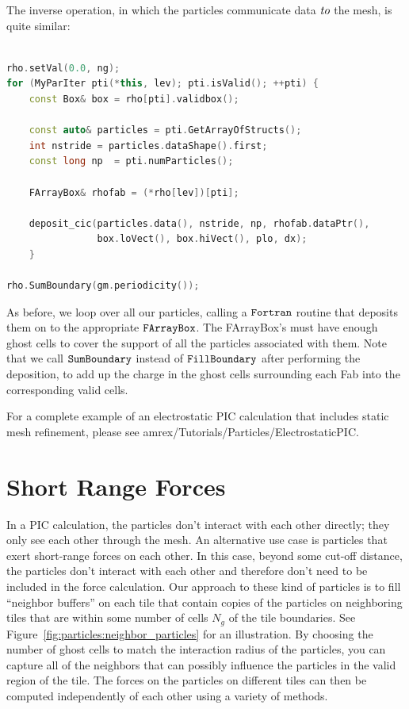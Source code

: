 The inverse operation, in which the particles communicate data $\emph{to}$ the mesh, is quite similar:

\begin{lstlisting}[language=cpp]

rho.setVal(0.0, ng);
for (MyParIter pti(*this, lev); pti.isValid(); ++pti) {
    const Box& box = rho[pti].validbox();

    const auto& particles = pti.GetArrayOfStructs();
    int nstride = particles.dataShape().first;
    const long np  = pti.numParticles();

    FArrayBox& rhofab = (*rho[lev])[pti];

    deposit_cic(particles.data(), nstride, np, rhofab.dataPtr(), 
                box.loVect(), box.hiVect(), plo, dx);
    }

rho.SumBoundary(gm.periodicity());

\end{lstlisting}

As before, we loop over all our particles, calling a $\tt{Fortran}$ routine that deposits them on to the appropriate $\tt{FArrayBox}$. The FArrayBox's must have enough ghost cells to
cover the support of all the particles associated with them. Note that we call $\tt{SumBoundary}$ instead of $\tt{FillBoundary}$ after performing the deposition, to add up the charge 
in the ghost cells surrounding each Fab into the corresponding valid cells.

For a complete example of an electrostatic PIC calculation that includes static mesh refinement, please see amrex/Tutorials/Particles/ElectrostaticPIC.

\section{Short Range Forces}
\label{sec:Particles:ShortRange}

In a PIC calculation, the particles don't interact with each other directly; they only see each other through the mesh. An alternative use case is particles that exert short-range forces on each other. In this case, beyond some cut-off distance, the particles don't interact with each other and therefore don't need to be included in the force calculation. Our approach to these kind of particles is to fill ``neighbor buffers'' on each tile that contain copies of the particles on neighboring tiles that are within some number of cells $N_g$ of the tile boundaries. See Figure~\ref{fig:particles:neighbor_particles} for an illustration. By choosing the number of ghost cells to match the interaction radius of the particles, you can capture all of the neighbors that can possibly influence the particles in the valid region of the tile. The forces on the particles on different tiles can then be computed independently of each other using a variety of methods.

